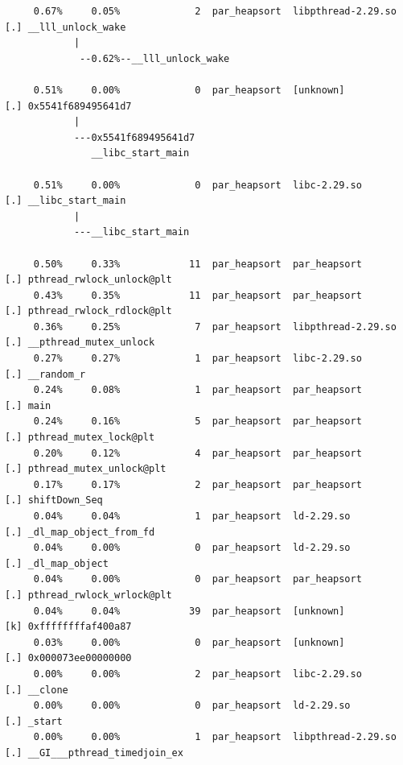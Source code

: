 \documentclass{article}
\begin{document}
\begin{verbatim}
     0.67%     0.05%             2  par_heapsort  libpthread-2.29.so  [.] __lll_unlock_wake
            |
             --0.62%--__lll_unlock_wake

     0.51%     0.00%             0  par_heapsort  [unknown]           [.] 0x5541f689495641d7
            |
            ---0x5541f689495641d7
               __libc_start_main

     0.51%     0.00%             0  par_heapsort  libc-2.29.so        [.] __libc_start_main
            |
            ---__libc_start_main

     0.50%     0.33%            11  par_heapsort  par_heapsort        [.] pthread_rwlock_unlock@plt
     0.43%     0.35%            11  par_heapsort  par_heapsort        [.] pthread_rwlock_rdlock@plt
     0.36%     0.25%             7  par_heapsort  libpthread-2.29.so  [.] __pthread_mutex_unlock
     0.27%     0.27%             1  par_heapsort  libc-2.29.so        [.] __random_r
     0.24%     0.08%             1  par_heapsort  par_heapsort        [.] main
     0.24%     0.16%             5  par_heapsort  par_heapsort        [.] pthread_mutex_lock@plt
     0.20%     0.12%             4  par_heapsort  par_heapsort        [.] pthread_mutex_unlock@plt
     0.17%     0.17%             2  par_heapsort  par_heapsort        [.] shiftDown_Seq
     0.04%     0.04%             1  par_heapsort  ld-2.29.so          [.] _dl_map_object_from_fd
     0.04%     0.00%             0  par_heapsort  ld-2.29.so          [.] _dl_map_object
     0.04%     0.00%             0  par_heapsort  par_heapsort        [.] pthread_rwlock_wrlock@plt
     0.04%     0.04%            39  par_heapsort  [unknown]           [k] 0xffffffffaf400a87
     0.03%     0.00%             0  par_heapsort  [unknown]           [.] 0x000073ee00000000
     0.00%     0.00%             2  par_heapsort  libc-2.29.so        [.] __clone
     0.00%     0.00%             0  par_heapsort  ld-2.29.so          [.] _start
     0.00%     0.00%             1  par_heapsort  libpthread-2.29.so  [.] __GI___pthread_timedjoin_ex
\end{verbatim}
\normalsize
\end{document}
